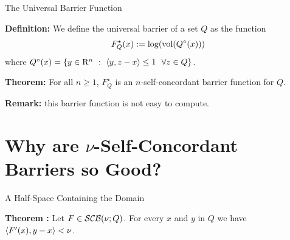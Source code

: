 \documentclass[9pt]{beamer}
\begin{document}
\begin{frame}{The Universal Barrier Function}


  \textbf{Definition:} We define the universal barrier of a set $Q$ as the function
  \[
    F^\star_Q(x) := \log({\rm{vol}}(Q^\circ(x)))
  \]
  where $Q^\circ(x)=\left\{ y\in\mathrm{R}^n\ : \ \left<y, z-x\right>\leq 1 ~~\forall z\in Q \right\}$.

  \vfill

  \textbf{Theorem:} For all $n\geq 1$, $F^\star_Q$ is an $n$-self-concordant barrier function for $Q$.

  \vfill

  \textbf{Remark:} this barrier function is not easy to compute.
  
\end{frame}

\section{Why are $\nu$-Self-Concordant Barriers so Good?}

\begin{frame}{A Half-Space Containing the Domain}

  \textbf{Theorem :} Let $F\in \mathcal{SCB}(\nu; Q)$. For every $x$ and $y$ in $Q$ we have $\left<F'(x), y-x\right>< \nu$.

  \vfill   

  \begin{center}
  \end{center}


\end{frame}
\end{document}
